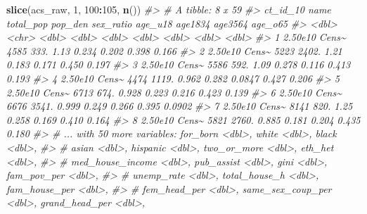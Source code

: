 \documentclass[
]{book}
\newenvironment{Shaded}{\begin{snugshade}}{\end{snugshade}}
\newcommand{\CommentTok}[1]{\textcolor[rgb]{0.56,0.35,0.01}{\textit{#1}}}
\newcommand{\DecValTok}[1]{\textcolor[rgb]{0.00,0.00,0.81}{#1}}
\newcommand{\KeywordTok}[1]{\textcolor[rgb]{0.13,0.29,0.53}{\textbf{#1}}}
\newcommand{\NormalTok}[1]{#1}
\newcommand{\OperatorTok}[1]{\textcolor[rgb]{0.81,0.36,0.00}{\textbf{#1}}}
\begin{document}
\begin{Shaded}
\begin{Highlighting}[]
\KeywordTok{slice}\NormalTok{(acs\_raw, }\DecValTok{1}\NormalTok{, }\DecValTok{100}\OperatorTok{:}\DecValTok{105}\NormalTok{, }\KeywordTok{n}\NormalTok{())}
\CommentTok{\#\textgreater{} \# A tibble: 8 x 59}
\CommentTok{\#\textgreater{}   ct\_id\_10 name  total\_pop pop\_den sex\_ratio age\_u18 age1834 age3564 age\_o65}
\CommentTok{\#\textgreater{}      \textless{}dbl\textgreater{} \textless{}chr\textgreater{}     \textless{}dbl\textgreater{}   \textless{}dbl\textgreater{}     \textless{}dbl\textgreater{}   \textless{}dbl\textgreater{}   \textless{}dbl\textgreater{}   \textless{}dbl\textgreater{}   \textless{}dbl\textgreater{}}
\CommentTok{\#\textgreater{} 1  2.50e10 Cens\textasciitilde{}      4585    333.     1.13    0.234  0.202    0.398  0.166 }
\CommentTok{\#\textgreater{} 2  2.50e10 Cens\textasciitilde{}      5223   2402.     1.21    0.183  0.171    0.450  0.197 }
\CommentTok{\#\textgreater{} 3  2.50e10 Cens\textasciitilde{}      5586    592.     1.09    0.278  0.116    0.413  0.193 }
\CommentTok{\#\textgreater{} 4  2.50e10 Cens\textasciitilde{}      4474   1119.     0.962   0.282  0.0847   0.427  0.206 }
\CommentTok{\#\textgreater{} 5  2.50e10 Cens\textasciitilde{}      6713    674.     0.928   0.223  0.216    0.423  0.139 }
\CommentTok{\#\textgreater{} 6  2.50e10 Cens\textasciitilde{}      6676   3541.     0.999   0.249  0.266    0.395  0.0902}
\CommentTok{\#\textgreater{} 7  2.50e10 Cens\textasciitilde{}      8141    820.     1.25    0.258  0.169    0.410  0.164 }
\CommentTok{\#\textgreater{} 8  2.50e10 Cens\textasciitilde{}      5821   2760.     0.885   0.181  0.204    0.435  0.180 }
\CommentTok{\#\textgreater{} \# ... with 50 more variables: for\_born \textless{}dbl\textgreater{}, white \textless{}dbl\textgreater{}, black \textless{}dbl\textgreater{},}
\CommentTok{\#\textgreater{} \#   asian \textless{}dbl\textgreater{}, hispanic \textless{}dbl\textgreater{}, two\_or\_more \textless{}dbl\textgreater{}, eth\_het \textless{}dbl\textgreater{},}
\CommentTok{\#\textgreater{} \#   med\_house\_income \textless{}dbl\textgreater{}, pub\_assist \textless{}dbl\textgreater{}, gini \textless{}dbl\textgreater{}, fam\_pov\_per \textless{}dbl\textgreater{},}
\CommentTok{\#\textgreater{} \#   unemp\_rate \textless{}dbl\textgreater{}, total\_house\_h \textless{}dbl\textgreater{}, fam\_house\_per \textless{}dbl\textgreater{},}
\CommentTok{\#\textgreater{} \#   fem\_head\_per \textless{}dbl\textgreater{}, same\_sex\_coup\_per \textless{}dbl\textgreater{}, grand\_head\_per \textless{}dbl\textgreater{},}

\end{Highlighting}
\end{Shaded}
\end{document}
